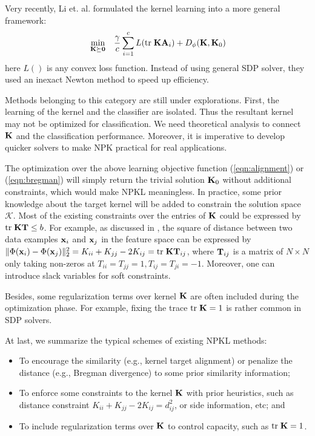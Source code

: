Very recently, Li et. al. formulated the kernel learning into a more general framework:
\begin{eqnarray}
&\min_{{\mathbf K}{\succeq{\mathbf 0}}}& \frac{\gamma}{c}\sum_{i=1}^c L({\mbox{tr}\;}{\mathbf K}\mathbf A_i)+D_{\phi}({\mathbf K},{\mathbf K}_0)
\end{eqnarray}
here $L()$ is any convex loss function. Instead of using general SDP solver, they used an inexact Newton method to speed up efficiency.

Methods belonging to this category are still under explorations. First, the learning of the kernel and the classifier are isolated. Thus the resultant kernel may not be optimized for classification. We need theoretical analysis to connect ${\mathbf K}$ and the classification performance. Moreover, it is imperative to develop quicker solvers to make NPK practical for real applications.

The optimization over the above learning objective function (\ref{eqn:alignment}) or (\ref{eqn:bregman}) will simply return the trivial solution ${\mathbf K}_0$ without additional constraints, which would make NPKL meaningless. In practice, some prior knowledge about the target kernel will be added to constrain the solution space $\mathcal K$. Most of the existing constraints over the entries of ${\mathbf K}$ could be expressed by ${\mbox{tr}\;}{\mathbf K}{\bf T}\leq b$. For example, as discussed in \cite{icml/Kwok03}, the square of distance between two data examples $\mathbf{x}_i$ and $\mathbf{x}_j$ in the feature space can be expressed by $\|\Phi(\mathbf{x}_i) - \Phi(\mathbf{x}_j)\|^2_2 = K_{ii} + K_{jj} - 2K_{ij} = {\mbox{tr}\;}{\mathbf K}{\bf T}_{ij}$, where ${\bf T}_{ij}$ is a matrix of $N\times N$ only taking non-zeros at $T_{ii}=T_{jj}=1, T_{ij}=T_{ji} = -1$. Moreover, one can introduce slack variables for soft constraints.

Besides, some regularization terms over kernel ${\mathbf K}$ are often included during the optimization phase. For example, fixing the trace ${\mbox{tr}\;}{\mathbf K}=1$ is rather common in SDP solvers.

At last, we summarize the typical schemes of existing NPKL methods:
\vspace{-0.1in}
\begin{itemize}
  \item To encourage the similarity (e.g., kernel target alignment) or penalize the distance
    (e.g., Bregman divergence) to some prior similarity information; %
  \item To enforce some constraints to the kernel ${\mathbf K}$ with prior heuristics, such as
    distance constraint $K_{ii}+K_{jj}-2K_{ij}=d_{ij}^2$, or side information,
    etc; and %
  \item To include regularization terms over ${\mathbf K}$ to control capacity, such as ${\mbox{tr}\;}{\mathbf K}=1$.
\end{itemize}

